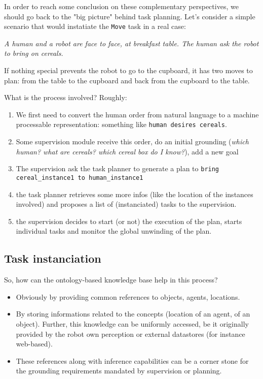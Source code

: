 In order to reach some conclusion on these complementary perspectives, we
should go back to the "big picture" behind task planning. Let's consider a
simple scenario that would instatiate the {\tt Move} task in a real case:

\emph{A human and a robot are face to face, at breakfast table. The human ask
the robot to bring on cereals.}

If nothing special prevents the robot to go to the cupboard, it has two moves
to plan: from the table to the cupboard and back from the cupboard to the
table.

What is the process involved? Roughly:


\begin{enumerate}

\item  We first need to convert the human order from natural language to a
machine processable representation: something like {\tt human desires cereals}.

\item  Some supervision module receive this order, do an initial grounding
(\emph{which human? what are cereals? which cereal box do I know?}), add a new
goal

\item  The supervision ask the task planner to generate a plan to {\tt bring
cereal\_instance1 to human\_instance1}

\item  the task planner retrieves some more infos (like the location of the
instances involved) and proposes a list of (instanciated) tasks to the
supervision.

\item  the supervision decides to start (or not) the execution of the plan,
starts individual tasks and monitor the global unwinding of the plan.

\end{enumerate}

\subsection{Task instanciation}

So, how can the ontology-based knowledge base help in this process?


\begin{itemize}

\item  Obviously by providing common references to objects, agents, locations.

\item  By storing informations related to the concepts (location of an agent,
of an object). Further, this knowledge can be uniformly accessed, be it
originally provided by the robot own perception or external datastores (for
instance web-based).

\item  These references along with inference capabilities can be a corner stone
for the grounding requirements mandated by supervision or planning.

\end{itemize}

